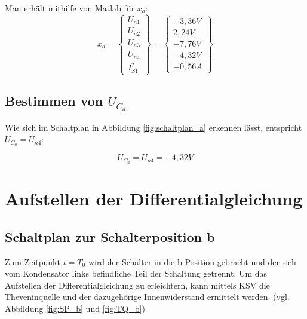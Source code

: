 \documentclass[11pt]{scrartcl}
\begin{document}
Man erhält mithilfe von Matlab für $x_a$:
\begin{equation*}
  \renewcommand{\arraystretch}{1.5}
  x_a = \begin{Bmatrix}
    U_{n1} \\
    U_{n2} \\
    U_{n3} \\
    U_{n4} \\
    I_{S1}^?
  \end{Bmatrix} =
  \begin{Bmatrix}
    -3,36 \unit{V} \\
    2,24 \unit{V} \\
    -7,76 \unit{V} \\
    -4,32 \unit{V} \\
    -0,56 \unit{A}
  \end{Bmatrix}
\end{equation*}

\subsection{Bestimmen von $U_{C_a}$} \label{sec:u_c}

Wie sich im Schaltplan in Abbildung \ref{fig:schaltplan_a} erkennen lässt, entspricht $U_{C_a} = U_{n4}$:

\begin{equation*}
  U_{C_a} = U_{n4} = -4,32 \unit{V}
\end{equation*}


\pagebreak

\section{Aufstellen der Differentialgleichung} %
\subsection{Schaltplan zur Schalterposition b}

Zum Zeitpunkt $t = T_0$ wird der Schalter in die b Position gebracht und der sich vom Kondensator links befindliche Teil der Schaltung getrennt. Um das Aufstellen der Differentialgleichung zu erleichtern, kann mittels KSV die Theveninquelle und der dazugehörige Innenwiderstand ermittelt werden. (vgl. Abbildung \ref{fig:SP_b} und \ref{fig:TQ_b})
\end{document}
